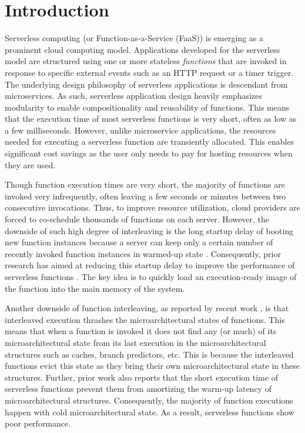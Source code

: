 \section{Introduction}
Serverless computing (or Function-as-a-Service (FaaS)) is emerging as a prominent cloud computing model. Applications developed for the serverless model are structured using one or more stateless \emph{functions} that are invoked in response to specific external events such as an HTTP request or a timer trigger.  The underlying design philosophy of serverless applications is descendant from microservices. As such, serverless application design heavily emphasizes modularity to enable compositionality and reusability of functions. This means that the execution time of most serverless functions is very short, often as low as a few milliseconds. However, unlike microservice applications, the resources needed for executing a serverless function are transiently allocated. This enables significant cost savings as the user only needs to pay for hosting resources when they are used.

Though function execution times are very short, the majority of functions are invoked very infrequently, often leaving a few seconds or minutes between two consecutive invocations. Thus, to improve resource utilization, cloud providers are forced to co-schedule thousands of functions on each server. However, the downside of such high degree of interleaving is the long startup delay of booting new function instances because a server can keep only a certain number of recently invoked function instances in warmed-up state \cite{lloyd18_server_comput, wang18_peekin_behin_curtain_server_platf,  lee18_evaluat_produc_server_comput_envir}. Consequently, prior research has aimed at reducing this startup delay to improve the performance of serverless functions \cite{ustiugov21_bench_analy_optim_server_funct_snaps, du20_catal}. The key idea is to quickly load an execution-ready image of the function into the main memory of the system.

Another downside of function interleaving, as reported by recent work \cite{shahrad19_archit_implic_funct_servic_comput, lukewarm_serverless}, is that interleaved execution thrashes the microarchitectural states of functions. This means that when a function is invoked it does not find any (or much) of its microarchitectural state from its last execution in the microarchitectural structures such as caches, branch predictors, etc. This is because the interleaved functions evict this state as they bring their own microarchitectural state in these structures. Further, prior work \cite{shahrad19_archit_implic_funct_servic_comput} also reports that the short execution time of serverless functions prevent them from amortizing the warm-up latency of microarchitectural structures. Consequently, the majority of function executions happen with cold microarchitectural state. As a result, serverless functions show poor performance.


